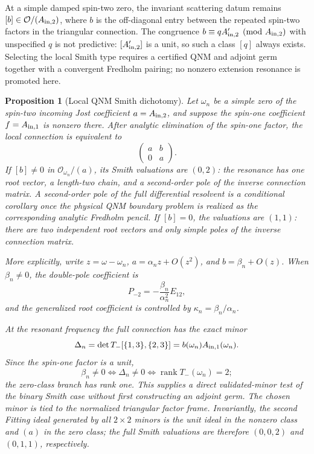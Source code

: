 \documentclass[11pt]{article}
\newtheorem{proposition}[theorem]{Proposition}
\theoremstyle{definition}
\theoremstyle{remark}
\begin{document}
At a simple damped spin-two zero, the invariant scattering datum remains
\([b]\in\mathcal O/(A_{{\rm in},2})\), where \(b\) is the off-diagonal
entry between the repeated spin-two factors in the triangular connection.
The congruence
\(b\equiv qA_{{\rm in},2}'\pmod{A_{{\rm in},2}}\) with unspecified \(q\)
is not predictive: \([A_{{\rm in},2}']\) is a unit, so such a class
\([q]\) always exists.  Selecting the local Smith type requires a certified
QNM and adjoint germ together with a convergent Fredholm pairing; no
nonzero extension resonance is promoted here.

\begin{proposition}[Local QNM Smith dichotomy]
\label{prop:axial-qnm-smith-dichotomy}
Let \(\omega_n\) be a simple zero of the spin-two incoming Jost
coefficient \(a=A_{{\rm in},2}\), and suppose the spin-one coefficient
\(f=A_{{\rm in},1}\) is nonzero there.  After analytic elimination of the
spin-one factor, the local connection is equivalent to
\[
 \begin{pmatrix}a&b\\0&a\end{pmatrix}.
\]
If \([b]\ne0\) in \(\mathcal O_{\omega_n}/(a)\), its Smith valuations are
\((0,2)\): the resonance has one root vector, a length-two chain, and a
second-order pole of the inverse connection matrix.  A second-order pole of
the full differential resolvent is a conditional corollary once the physical
QNM boundary problem is realized as the corresponding analytic Fredholm
pencil.  If \([b]=0\), the valuations are \((1,1)\): there are two independent
root vectors and only simple poles of the inverse connection matrix.

More explicitly, write \(z=\omega-\omega_n\),
\(a=\alpha_n z+O(z^2)\), and \(b=\beta_n+O(z)\).  When
\(\beta_n\ne0\), the double-pole coefficient is
\[
 P_{-2}=-\frac{\beta_n}{\alpha_n^2}E_{12},
\]
and the generalized root coefficient is controlled by
\(\kappa_n=\beta_n/\alpha_n\).

At the resonant frequency the full connection has the exact minor
\[
 \Delta_n=
 \det T_-[\{1,3\},\{2,3\}]
 =b(\omega_n)A_{{\rm in},1}(\omega_n).
\]
Since the spin-one factor is a unit,
\[
\beta_n\ne0
\Longleftrightarrow \Delta_n\ne0
\Longleftrightarrow \operatorname{rank}T_-(\omega_n)=2;
\]
the zero-class branch has rank one.  This supplies a direct validated-minor
test of the binary Smith case without first constructing an adjoint germ.
The chosen minor is tied to the normalized triangular factor frame.
Invariantly, the second Fitting ideal generated by all \(2\times2\) minors
is the unit ideal in the nonzero class and \((a)\) in the zero class; the
full Smith valuations are therefore \((0,0,2)\) and \((0,1,1)\),
respectively.


\end{proposition}
\end{document}

